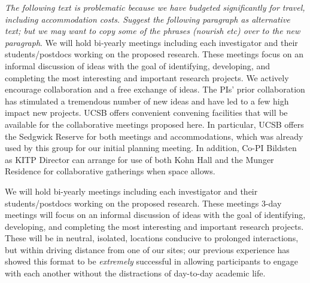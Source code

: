 \emph{The following text is problematic because we have budgeted significantly for travel, including accommodation costs. Suggest the following paragraph as alternative text; but we may want to copy some of the phrases (nourish etc) over to the new paragraph}. We will hold bi-yearly meetings including each investigator and their students/postdocs working on the proposed research. These meetings focus on an informal discussion of ideas with the goal of identifying, developing, and completing the most interesting and important research projects. We actively encourage collaboration and a free exchange of ideas. The PIs' prior collaboration has stimulated a tremendous number of new ideas and have led to a few high impact new projects. UCSB offers convenient convening facilities that will be available for the collaborative meetings proposed here. In particular, UCSB offers the Sedgwick Reserve for both meetings and accommodations, which was already used by this group for our initial planning meeting. In addition, Co-PI Bildsten as KITP Director can arrange for use of both Kohn Hall and the Munger Residence for collaborative gatherings when space allows.

We will hold bi-yearly meetings including each investigator and their students/postdocs working on the proposed research. These meetings 3-day meetings will focus on an informal discussion of ideas with the goal of identifying, developing, and completing the most interesting and important research projects. These will be in neutral, isolated, locations conducive to prolonged interactions, but within driving distance from one of our sites; our previous experience has showed this format to be \emph{extremely} successful in allowing participants to engage with each another without the distractions of day-to-day academic life. 
